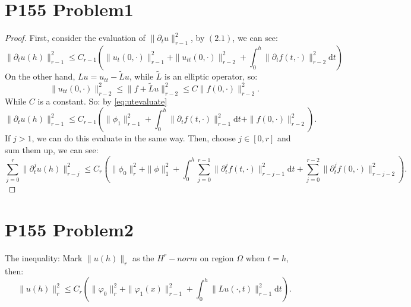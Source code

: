 \documentclass[a4paper]{ctexart}
\newcommand{\dif}{\mathrm{d}}
\begin{document}
\section*{P155 Problem1}
\begin{proof}
    First, consider the evaluation of $\|\partial_{t}u\|_{r-1}^{2}$, by $(2.1)$, we can see:
    \begin{equation}
        \label{eq:utevaluate}
        \|\partial_{t}u(h)\|_{r-1}^{2}\le C_{r-1}\left(\|u_{t}(0,\cdot)\|_{r-1}^{2}+\|u_{tt}(0,\cdot)\|_{r-2}^{2}+\int_{0}^{h}\|\partial_{t}f(t,\cdot)\|_{r-2}^{2}\dif t\right)
    \end{equation}
    On the other hand, $Lu=u_{tt}-\tilde{L}u$, while $\tilde{L}$ is an elliptic operator, so:
    \begin{equation}
        \|u_{tt}(0,\cdot)\|_{r-2}^{2}\le\|f+\tilde{L}u\|_{r-2}^{2}\le C\|f(0,\cdot)\|_{r-2}^{2}.
    \end{equation}
    While $C$ is a constant. So: by \eqref{eq:utevaluate}
    \begin{equation}
        \|\partial_{t}u(h)\|_{r-1}^{2}\le C_{r-1}(\|\phi_{1}\|_{r-1}^{2}+\int_{0}^{h}\|\partial_{t}f(t,\cdot)\|_{r-1}^{2}\dif t+\|f(0,\cdot)\|_{r-2}^{2}).
    \end{equation}
    If $j>1$, we can do this evaluate in the same way. Then, choose $j\in[0,r]$ and sum them up, we can see:
    \begin{equation}
        \sum_{j=0}^{r}\|\partial_{t}^{j}u(h)\|_{r-j}^{2}\le C_{r}\left(\|\phi_{0}\|_{r}^{2}+\|\phi\|_{1}^{2}+\int_{0}^{h}\sum_{j=0}^{r-1}\|\partial_{t}^{j}f(t,\cdot)\|_{r-j-1}^{2}\dif t+\sum_{j=0}^{r-2}\|\partial_{t}^{j}f(0,\cdot)\|_{r-j-2}^{2}\right).
    \end{equation}
\end{proof}
\section*{P155 Problem2}
The inequality: Mark $\|u(h)\|_{r}$ as the $H^{r}-norm$ on region $\Omega$ when $t=h$, then:
\begin{equation}
    \|u(h)\|_{r}^{2}\le C_{r}\left(\|\varphi_{0}\|_{r}^{2}+\|\varphi_{1}(x)\|_{r-1}^{2}+\int_{0}^{h}\|Lu(\cdot,t)\|_{r-1}^{2}\dif t\right).
\end{equation}
\end{document}
